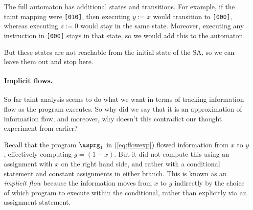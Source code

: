 \documentclass[11pt,twoside]{scrartcl}
\begin{document}
The full automaton has additional states and transitions. For example, if the taint mapping were \verb'[010]', then executing $y := x$ would transition to \verb'[000]', whereas executing $z := 0$ would stay in the same state. Moreover, executing any instruction in \verb'[000]' stays in that state, so we would add this to the automaton.
\begin{center}
\end{center}
But these states are not reachable from the initial state of the SA, so we can leave them out and stop here.

\paragraph{Implicit flows.} So far taint analysis seems to do what we want in terms of tracking information flow as the program executes. So why did we say that it is an approximation of information flow, and moreover, why doesn't this contradict our thought experiment from earlier?

Recall that the program $\asprg_1$ in (\ref{eq:flowexp}) flowed information from $x$ to $y$, effectively computing $y = (1 - x)$. But it did not compute this using an assignment with $x$ on the right hand side, and rather with a conditional statement and constant assignments in either branch. This is known as an \emph{implicit flow} because the information moves from $x$ to $y$ indirectly by the choice of which program to execute within the conditional, rather than explicitly via an assignment statement.
\end{document}
